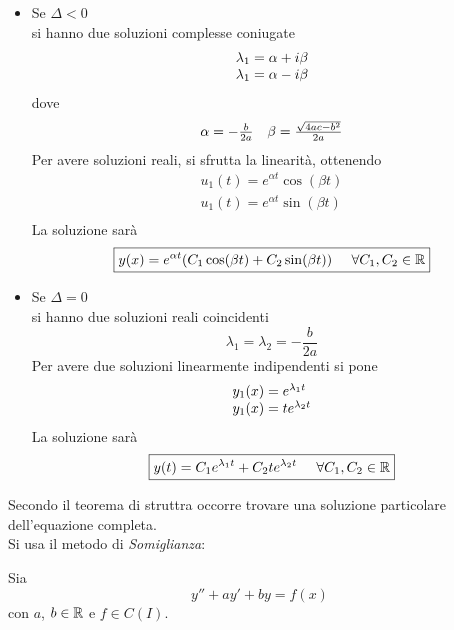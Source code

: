 \begin{itemize}
    \item Se $\Delta < 0$ \\
    si hanno due soluzioni complesse coniugate
    \[  \begin{array}{l l}
        \lambda_1 = \alpha + i \beta \\
        \lambda_1 = \alpha - i \beta 
    \end{array} \]
    dove \[ \begin{array}{l l} \alpha=-\frac{b}{2a} & \beta=\frac{\sqrt{4ac - b^2}}{2a} \end{array} \]
    Per avere soluzioni reali, si sfrutta la linearità, ottenendo
    \begin{equation}
        \begin{array}{l}
            u_1(t) = e^{\alpha t}\cos (\beta t) \\
            u_1(t) = e^{\alpha t}\sin (\beta t) \\
        \end{array}
    \end{equation}
    La soluzione sarà
    \begin{equation}
        \boxed{y(x) = e^{\alpha t}(C_1 \cos(\beta t) + C_2 \sin(\beta t) ) \mspace{25mu} \forall C_1, C_2 \in \mathbb{R}}
    \end{equation}
    \item Se $\Delta = 0$ \\
    si hanno due soluzioni reali coincidenti
    \[ \lambda_1 = \lambda_2 = -\frac{b}{2a}\]
    Per avere due soluzioni linearmente indipendenti si pone
    \begin{equation}
        \begin{array}{l l}
            y_1(x) = e^{\lambda_1 t} \\
            y_1(x) = t e^{\lambda_2 t} 
        \end{array} 
    \end{equation}
    La soluzione sarà
    \begin{equation}
        \boxed{y(t) = C_1 e^{\lambda_1 t} + C_2 t e^{\lambda_2 t} \mspace{25mu} \forall C_1, C_2 \in \mathbb{R}}
    \end{equation}
\end{itemize}

Secondo il teorema di struttra occorre trovare una soluzione particolare dell'equazione completa. \\
Si usa il metodo di \emph{Somiglianza}:
 
Sia 
\[ y'' +ay' + by = f(x)  \]
con $a$, $b \in \mathbb{R}$ e $f \in C(I)$.

